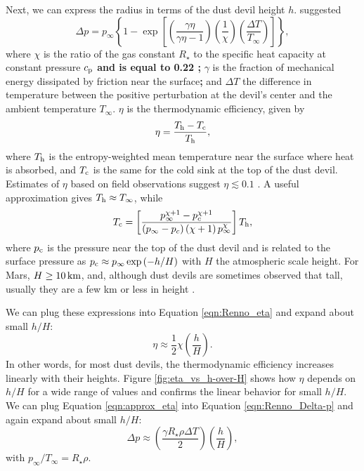 \documentclass{aastex63}
\begin{document}
Next, we can express the radius in terms of the dust devil height $h$. \citet{1998JAtS...55.3244R} suggested
\begin{equation}
    \Delta p = p_{\infty} \left\{ 1 - \exp \left[ \left( \dfrac{\gamma \eta}{\gamma \eta - 1}\right) \left(\dfrac{1}{\chi}\right) \left( \dfrac{\Delta T}{T_{\infty}}\right) \right] \right\}\label{eqn:Renno_Delta-p},
\end{equation}
where $\chi$ is the ratio of the gas constant $R_\star$ to the specific heat capacity at constant pressure $c_{\rm p}$ {\bf and is equal to 0.22 \citep{2000JGR...105.1859R}}{\bf;} $\gamma$ is the fraction of mechanical energy dissipated by friction near the surface{\bf;} and $\Delta T$ the difference in temperature between the positive perturbation at the devil's center and the ambient temperature $T_\infty$. $\eta$ is the thermodynamic efficiency, given by 
\begin{equation}
    \eta = \dfrac{T_{\rm h} - T_{\rm c}}{T_{\rm h}}\label{eqn:Renno_eta},
\end{equation}{}
where $T_{\rm h}$ is the entropy-weighted mean temperature near the surface where heat is absorbed, and $T_{\rm c}$ is the same for the cold sink at the top of the dust devil. Estimates of $\eta$ based on field observations suggest $\eta \lesssim 0.1$ \citep[e.g.][]{2000JGR...105.1859R}. A useful approximation gives $T_{\rm h} \approx T_\infty$, while
\begin{equation}
    T_{\rm c} = \left[ \dfrac{ p_\infty^{\chi + 1} - p_{c}^{\chi + 1} }{\left( p_\infty - p_{c} \right) \left( \chi + 1\right) p_\infty^{\chi}} \right] T_{\rm h},\label{eqn:Tc}
\end{equation}
where $p_{\rm c}$ is the pressure near the top of the dust devil  {\bf \citep{2000JGR...105.1859R}} and is related to the surface pressure as $p_{\rm c} \approx p_\infty \exp\left(-h/H\right)$ with $H$ the atmospheric scale height. For Mars, $H \ge 10\,{\rm km}$, and, although dust devils are sometimes observed that tall, usually they are a few km or less in height \citep{2008Icar..197...39S}. 

We can plug these expressions into Equation \ref{eqn:Renno_eta} and expand about small $h/H$:
\begin{equation}
    \eta \approx \frac{1}{2} \chi \left( \dfrac{h}{H} \right).\label{eqn:approx_eta}
\end{equation}
In other words, for most dust devils, the thermodynamic efficiency increases linearly with their heights. Figure \ref{fig:eta_vs_h-over-H} shows how $\eta$ depends on $h/H$ for a wide range of values and confirms the linear behavior for small $h/H$. We can plug Equation \ref{eqn:approx_eta} into Equation \ref{eqn:Renno_Delta-p} and again expand about small $h/H$:
\begin{equation}
    \Delta p \approx \left( \dfrac{\gamma R_\star \rho \Delta T}{2} \right) \left( \dfrac{h}{H} \right) \label{eqn:approx_Delta-p},
\end{equation}
with $p_\infty/T_\infty = R_\star \rho$.
\end{document}
